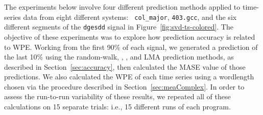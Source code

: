 The experiments below involve four different prediction methods
applied to time-series data from eight different systems: {\tt
  col\_major}, {\tt 403.gcc}, and the six different segments of the
{\tt dgesdd} signal in Figure~\ref{fig:svd-ts-colored}.  The objective
of these experiments was to explore how prediction accuracy is related
to WPE.
%
%
Working from the first 90\% of each signal, we generated a prediction
of the last 10\% using the random-walk, \naive, \arima, and LMA prediction methods,
as described in Section~\ref{sec:accuracy}, then calculated the MASE
value of those predictions.  We also calculated the WPE of each time
series using a wordlength chosen via the procedure described in
Section~\ref{sec:meaComplex}.  In order to assess the run-to-run
variability of these results, we repeated all of these calculations on
15 separate trials: i.e., 15 different runs of each program.


